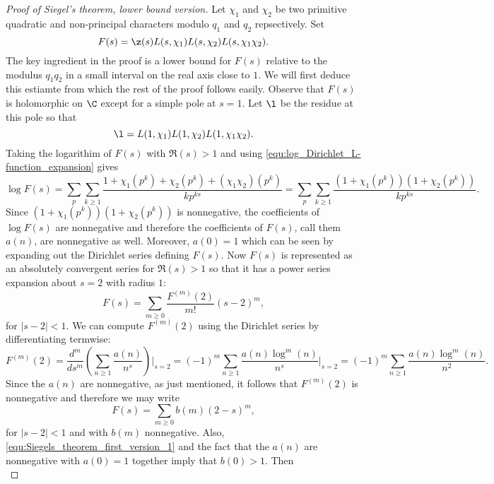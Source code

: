       \begin{proof}[Proof of Siegel's theorem, lower bound version]
        Let $\chi_{1}$ and $\chi_{2}$ be two primitive quadratic and non-principal characters modulo $q_{1}$ and $q_{2}$ repsectively. Set
        \[
          F(s) = \z(s)L(s,\chi_{1})L(s,\chi_{2})L(s,\chi_{1}\chi_{2}).
        \]
        The key ingredient in the proof is a lower bound for $F(s)$ relative to the modulus $q_{1}q_{2}$ in a small interval on the real axis close to $1$. We will first deduce this estiamte from which the rest of the proof follows easily. Observe that $F(s)$ is holomorphic on $\C$ except for a simple pole at $s = 1$. Let $\l$ be the residue at this pole so that
        \[
          \l = L(1,\chi_{1})L(1,\chi_{2})L(1,\chi_{1}\chi_{2}).
        \]
        Taking the logarithim of $F(s)$ with $\Re(s) > 1$ and using \cref{equ:log_Dirichlet_L-function_expansion} gives
        \[
          \log F(s) = \sum_{p}\sum_{k \ge 1}\frac{1+\chi_{1}(p^{k})+\chi_{2}(p^{k})+(\chi_{1}\chi_{2})(p^{k})}{kp^{ks}} = \sum_{p}\sum_{k \ge 1}\frac{(1+\chi_{1}(p^{k}))(1+\chi_{2}(p^{k}))}{kp^{ks}}.
        \]
        Since $(1+\chi_{1}(p^{k}))(1+\chi_{2}(p^{k}))$ is nonnegative, the coefficients of $\log F(s)$ are nonnegative and therefore the coefficients of $F(s)$, call them $a(n)$, are nonnegative as well. Moreover, $a(0) = 1$ which can be seen by expanding out the Dirichlet series defining $F(s)$. Now $F(s)$ is represented as an absolutely convergent series for $\Re(s) > 1$ so that it has a power series expansion about $s = 2$ with radius $1$:
        \[
          F(s) = \sum_{m \ge 0}\frac{F^{(m)}(2)}{m!}(s-2)^{m},
        \]
        for $|s-2| < 1$. We can compute $F^{(m)}(2)$ using the Dirichlet series by differentiating termwise:
        \begin{equation}\label{equ:Siegels_theorem_first_version_1}
          F^{(m)}(2) = \frac{d^{m}}{ds^{m}}\left(\sum_{n \ge 1}\frac{a(n)}{n^{s}}\right)\Bigg|_{s = 2} = (-1)^{m}\sum_{n \ge 1}\frac{a(n)\log^{m}(n)}{n^{s}}\Bigg|_{s = 2} = (-1)^{m}\sum_{n \ge 1}\frac{a(n)\log^{m}(n)}{n^{2}}.
        \end{equation}
        Since the $a(n)$ are nonnegative, as just mentioned, it follows that $F^{(m)}(2)$ is nonnegative and therefore we may write
        \[
          F(s) = \sum_{m \ge 0}b(m)(2-s)^{m},
        \]
        for $|s-2| < 1$ and with $b(m)$ nonnegative. Also, \cref{equ:Siegels_theorem_first_version_1} and the fact that the $a(n)$ are nonnegative with $a(0) = 1$ together imply that $b(0) > 1$. Then
        \begin{equation}\label{equ:Siegels_theorem_first_version_2}

\end{equation}
\end{proof}
